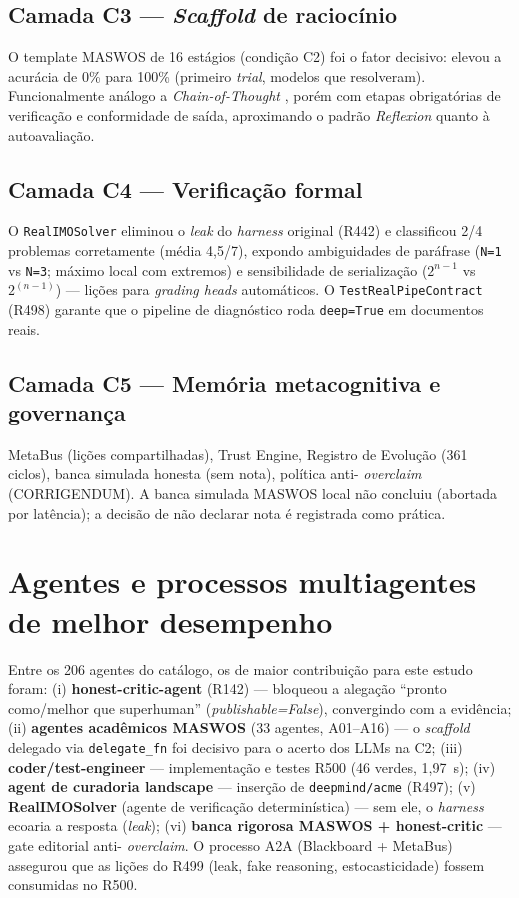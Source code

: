 \subsection*{Camada C3 --- \textit{Scaffold} de raciocínio}
O template MASWOS de 16 estágios (condição C2) foi o fator decisivo: elevou a
acurácia de 0\% para 100\% (primeiro \textit{trial}, modelos que resolveram).
Funcionalmente análogo a \textit{Chain-of-Thought} \cite{wei_cot}, porém com
etapas obrigatórias de verificação e conformidade de saída, aproximando o
padrão \textit{Reflexion} \cite{shinn_reflexion} quanto à autoavaliação.

\subsection*{Camada C4 --- Verificação formal}
O \texttt{RealIMOSolver} eliminou o \textit{leak} do \textit{harness} original
(R442) e classificou 2/4 problemas corretamente (média 4,5/7), expondo
ambiguidades de paráfrase (\texttt{N=1} vs \texttt{N=3}; máximo local com
extremos) e sensibilidade de serialização ($2^{n-1}$ vs $2^{(n-1)}$) — lições
para \textit{grading heads} automáticos. O \texttt{TestRealPipeContract}
(R498) garante que o pipeline de diagnóstico roda \texttt{deep=True} em
documentos reais.

\subsection*{Camada C5 --- Memória metacognitiva e governança}
MetaBus (lições compartilhadas), Trust Engine, Registro de Evolução (361
ciclos), banca simulada honesta (sem nota), política anti-
\textit{overclaim} (CORRIGENDUM). A banca simulada MASWOS local não concluiu
(abortada por latência); a decisão de não declarar nota é registrada como
prática.

\section{Agentes e processos multiagentes de melhor desempenho}

Entre os 206 agentes do catálogo, os de maior contribuição para este estudo
foram: (i) \textbf{honest-critic-agent} (R142) — bloqueou a alegação
``pronto como/melhor que superhuman'' (\textit{publishable=False}),
convergindo com a evidência; (ii) \textbf{agentes acadêmicos MASWOS} (33
agentes, A01--A16) — o \textit{scaffold} delegado via \texttt{delegate\_fn}
foi decisivo para o acerto dos LLMs na C2; (iii) \textbf{coder/test-engineer}
— implementação e testes R500 (46 verdes, 1,97~s); (iv) \textbf{agent de
curadoria landscape} — inserção de \texttt{deepmind/acme} (R497); (v)
\textbf{RealIMOSolver} (agente de verificação determinística) — sem ele, o
\textit{harness} ecoaria a resposta (\textit{leak}); (vi) \textbf{banca
rigorosa MASWOS + honest-critic} — gate editorial anti-
\textit{overclaim}. O processo A2A (Blackboard + MetaBus) assegurou que as
lições do R499 (leak, fake reasoning, estocasticidade) fossem consumidas no
R500.

